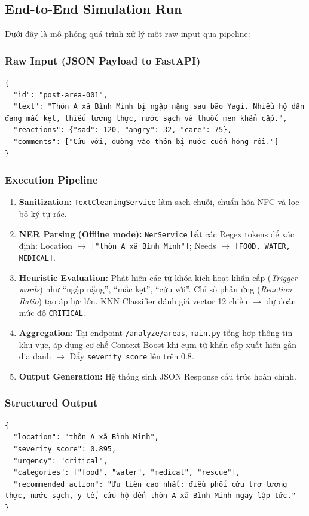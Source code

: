 \documentclass[12pt,a4paper]{article}
\begin{document}
\begin{itemize}
\subsection{End-to-End Simulation Run}
Dưới đây là mô phỏng quá trình xử lý một raw input qua pipeline:

\subsubsection{Raw Input (JSON Payload to FastAPI)}
\begin{lstlisting}[caption=Ví dụ đầu vào raw post gửi tới backend]
{
  "id": "post-area-001",
  "text": "Thôn A xã Bình Minh bị ngập nặng sau bão Yagi. Nhiều hộ dân đang mắc kẹt, thiếu lương thực, nước sạch và thuốc men khẩn cấp.",
  "reactions": {"sad": 120, "angry": 32, "care": 75},
  "comments": ["Cứu với, đường vào thôn bị nước cuốn hỏng rồi."]
}
\end{lstlisting}

\subsubsection{Execution Pipeline}
\begin{enumerate}
    \item \textbf{Sanitization:} \texttt{TextCleaningService} làm sạch chuỗi, chuẩn hóa NFC và lọc bỏ ký tự rác.
    \item \textbf{NER Parsing (Offline mode):} \texttt{NerService} bắt các Regex tokens để xác định: Location $\rightarrow$ \texttt{["thôn A xã Bình Minh"]}; Needs $\rightarrow$ \texttt{[FOOD, WATER, MEDICAL]}.
    \item \textbf{Heuristic Evaluation:} Phát hiện các từ khóa kích hoạt khẩn cấp (\textit{Trigger words}) như ``ngập nặng'', ``mắc kẹt'', ``cứu với''. Chỉ số phản ứng (\textit{Reaction Ratio}) tạo áp lực lớn. KNN Classifier đánh giá vector 12 chiều $\rightarrow$ dự đoán mức độ \texttt{CRITICAL}.
    \item \textbf{Aggregation:} Tại endpoint \texttt{/analyze/areas}, \texttt{main.py} tổng hợp thông tin khu vực, áp dụng cơ chế Context Boost khi cụm từ khẩn cấp xuất hiện gần địa danh $\rightarrow$ Đẩy \texttt{severity\_score} lên trên $0.8$.
    \item \textbf{Output Generation:} Hệ thống sinh JSON Response cấu trúc hoàn chỉnh.
\end{enumerate}

\subsubsection{Structured Output}
\begin{lstlisting}[caption=Ví dụ kết quả trích xuất cấu trúc]
{
  "location": "thôn A xã Bình Minh",
  "severity_score": 0.895,
  "urgency": "critical",
  "categories": ["food", "water", "medical", "rescue"],
  "recommended_action": "Ưu tiên cao nhất: điều phối cứu trợ lương thực, nước sạch, y tế, cứu hộ đến thôn A xã Bình Minh ngay lập tức."
}
\end{lstlisting}


\end{itemize}
\end{document}
